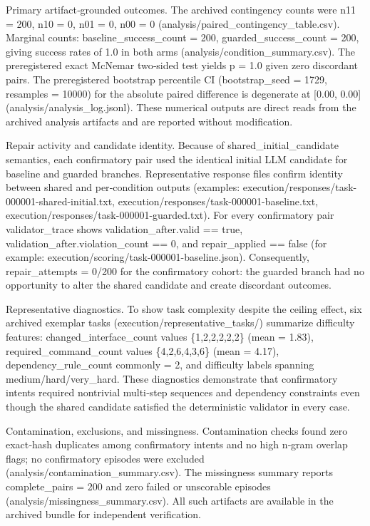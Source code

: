 \documentclass[conference]{IEEEtran}
\begin{document}
Primary artifact‑grounded outcomes. The archived contingency counts were n11 = 200, n10 = 0, n01 = 0, n00 = 0 (analysis/paired\_contingency\_table.csv). Marginal counts: baseline\_success\_count = 200, guarded\_success\_count = 200, giving success rates of 1.0 in both arms (analysis/condition\_summary.csv). The preregistered exact McNemar two‑sided test yields p = 1.0 given zero discordant pairs. The preregistered bootstrap percentile CI (bootstrap\_seed = 1729, resamples = 10000) for the absolute paired difference is degenerate at [0.00, 0.00] (analysis/analysis\_log.jsonl). These numerical outputs are direct reads from the archived analysis artifacts and are reported without modification.

Repair activity and candidate identity. Because of shared\_initial\_candidate semantics, each confirmatory pair used the identical initial LLM candidate for baseline and guarded branches. Representative response files confirm identity between shared and per‑condition outputs (examples: execution/responses/task-000001-shared-initial.txt, execution/responses/task-000001-baseline.txt, execution/responses/task-000001-guarded.txt). For every confirmatory pair validator\_trace shows validation\_after.valid == true, validation\_after.violation\_count == 0, and repair\_applied == false (for example: execution/scoring/task-000001-baseline.json). Consequently, repair\_attempts = 0/200 for the confirmatory cohort: the guarded branch had no opportunity to alter the shared candidate and create discordant outcomes.

Representative diagnostics. To show task complexity despite the ceiling effect, six archived exemplar tasks (execution/representative\_tasks/) summarize difficulty features: changed\_interface\_count values \{1,2,2,2,2,2\} (mean = 1.83), required\_command\_count values \{4,2,6,4,3,6\} (mean = 4.17), dependency\_rule\_count commonly = 2, and difficulty labels spanning medium/hard/very\_hard. These diagnostics demonstrate that confirmatory intents required nontrivial multi‑step sequences and dependency constraints even though the shared candidate satisfied the deterministic validator in every case.

Contamination, exclusions, and missingness. Contamination checks found zero exact‑hash duplicates among confirmatory intents and no high n‑gram overlap flags; no confirmatory episodes were excluded (analysis/contamination\_summary.csv). The missingness summary reports complete\_pairs = 200 and zero failed or unscorable episodes (analysis/missingness\_summary.csv). All such artifacts are available in the archived bundle for independent verification.
\end{document}
